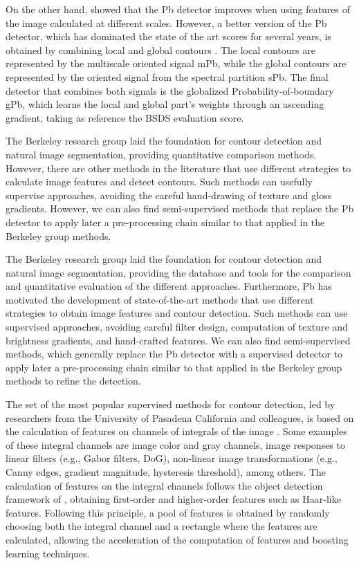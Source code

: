 \documentclass[journal]{IEEEtran}
\begin{document}
On the other hand, \cite{Ren:ECCV:2008} showed that the Pb detector improves when using features of the image calculated at different scales. However, a better version of the Pb detector, which has dominated the state of the art scores for several years, is obtained by combining local and global contours \cite{Maire.Arbelaez.ea:CVPR:2008}. The local contours are represented by the multiscale oriented signal mPb, while the global contours are represented by the oriented signal from the spectral partition sPb. The final detector that combines both signals is the globalized Probability-of-boundary gPb, which learns the local and global part's weights through an ascending gradient, taking as reference the BSDS evaluation score.

The Berkeley research group laid the foundation for contour detection and natural image segmentation, providing quantitative comparison methods. However, there are other methods in the literature that use different strategies to calculate image features and detect contours. Such methods can usefully supervise approaches, avoiding the careful hand-drawing of texture and gloss gradients. However, we can also find semi-supervised methods that replace the Pb detector to apply later a pre-processing chain similar to that applied in the Berkeley group methods.

The Berkeley research group laid the foundation for contour detection and natural image segmentation, providing the database and tools for the comparison and quantitative evaluation of the different approaches. Furthermore, Pb has motivated the development of state-of-the-art methods that use different strategies to obtain image features and contour detection. Such methods can use supervised approaches, avoiding careful filter design, computation of texture and brightness gradients, and hand-crafted features. We can also find semi-supervised methods, which generally replace the Pb detector with a supervised detector to apply later a pre-processing chain similar to that applied in the Berkeley group methods to refine the detection.

The set of the most popular supervised methods for contour detection, led by researchers from the University of Pasadena California and colleagues, is based on the calculation of features on channels of integrals of the image \cite{Dollar.Tu.ea:BMVC:2009}. Some examples of these integral channels are image color and gray channels, image responses to linear filters (e.g., Gabor filters, DoG), non-linear image transformations (e.g., Canny edges, gradient magnitude, hysteresis threshold), among others. The calculation of features on the integral channels follows the object detection framework of \cite{Viola.Jones:IJCV:2004}, obtaining first-order and higher-order features such as Haar-like features. Following this principle, a pool of features is obtained by randomly choosing both the integral channel and a rectangle where the features are calculated, allowing the acceleration of the computation of features and boosting learning techniques. 
\end{document}
